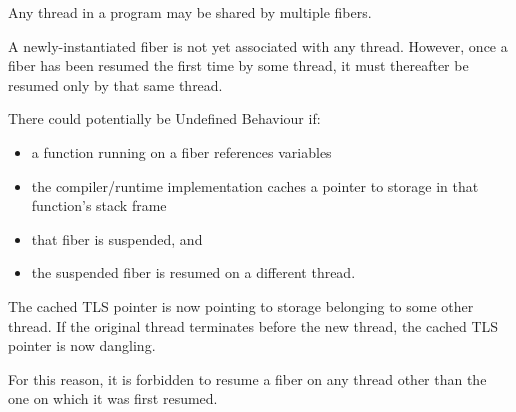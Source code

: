 \label{xthread}

Any thread in a program may be shared by multiple fibers.

A newly-instantiated fiber is not yet associated with any thread. However,
once a fiber has been resumed the first time by some thread, it must
thereafter be resumed only by that same thread.

There could potentially be Undefined Behaviour if:
\begin{itemize}
    \item a function running on a fiber references  variables
    \item the compiler/runtime implementation caches a pointer
          to  storage in that function's stack frame
    \item that fiber is suspended, and
    \item the suspended fiber is resumed on a different thread.
\end{itemize}

The cached TLS pointer is now pointing to storage belonging to some other
thread. If the original thread terminates before the new thread, the cached
TLS pointer is now dangling.

For this reason, it is forbidden to resume a fiber on any thread other than
the one on which it was first resumed.
